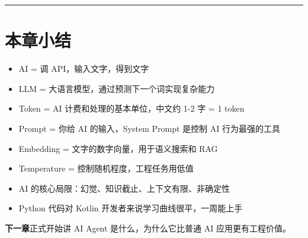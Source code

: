 \bigskip\hrule\bigskip

\section{本章小结}

\begin{itemize}[leftmargin=2em]
\item AI = 调 API，输入文字，得到文字
\item LLM = 大语言模型，通过预测下一个词实现复杂能力
\item Token = AI 计费和处理的基本单位，中文约 1-2 字 = 1 token
\item Prompt = 你给 AI 的输入，System Prompt 是控制 AI 行为最强的工具
\item Embedding = 文字的数字向量，用于语义搜索和 RAG
\item Temperature = 控制随机程度，工程任务用低值
\item AI 的核心局限：幻觉、知识截止、上下文有限、非确定性
\item Python 代码对 Kotlin 开发者来说学习曲线很平，一周能上手
\end{itemize}

\textbf{下一章}正式开始讲 AI Agent 是什么，为什么它比普通 AI 应用更有工程价值。
